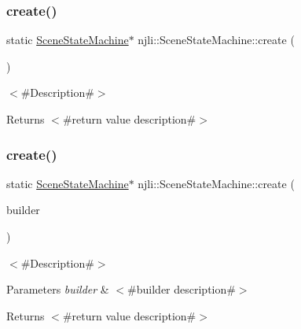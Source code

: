 \subsubsection{\texorpdfstring{create()}{create()}\hspace{0.1cm}{\footnotesize\ttfamily [1/2]}}
{\footnotesize\ttfamily static \mbox{\hyperlink{classnjli_1_1_scene_state_machine}{Scene\+State\+Machine}}$\ast$ njli\+::\+Scene\+State\+Machine\+::create (\begin{DoxyParamCaption}{ }\end{DoxyParamCaption})\hspace{0.3cm}{\ttfamily [static]}}

$<$\#\+Description\#$>$

\begin{DoxyReturn}{Returns}
$<$\#return value description\#$>$ 
\end{DoxyReturn}
\mbox{\label{classnjli_1_1_scene_state_machine_a70e5e383bfe8e85378b722a0ab5259fc}} 
\subsubsection{\texorpdfstring{create()}{create()}\hspace{0.1cm}{\footnotesize\ttfamily [2/2]}}
{\footnotesize\ttfamily static \mbox{\hyperlink{classnjli_1_1_scene_state_machine}{Scene\+State\+Machine}}$\ast$ njli\+::\+Scene\+State\+Machine\+::create (\begin{DoxyParamCaption}\item[{const \mbox{\hyperlink{classnjli_1_1_scene_state_machine_builder}{Scene\+State\+Machine\+Builder}} \&}]{builder }\end{DoxyParamCaption})\hspace{0.3cm}{\ttfamily [static]}}

$<$\#\+Description\#$>$


\begin{DoxyParams}{Parameters}
{\em builder} & $<$\#builder description\#$>$\\
\hline
\end{DoxyParams}
\begin{DoxyReturn}{Returns}
$<$\#return value description\#$>$ 
\end{DoxyReturn}
\mbox{\label{classnjli_1_1_scene_state_machine_aa2304fea832ff06310a7812d347d5fa4}} 
